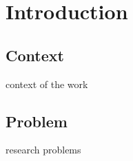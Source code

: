 \chapter{Introduction}
\label{chap:Introduction}

\section{Context}

context of the work

\section{Problem}
\label{sec:Introduction-Problem}

research problems